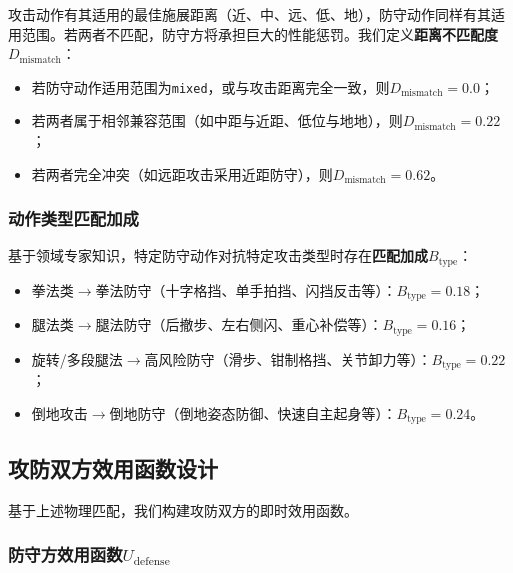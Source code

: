 \documentclass[a4paper,12pt]{article}
\numberwithin{equation}{section}
\numberwithin{table}{section}
\numberwithin{figure}{section}
\begin{document}
攻击动作有其适用的最佳施展距离（近、中、远、低、地），防守动作同样有其适用范围。若两者不匹配，防守方将承担巨大的性能惩罚。我们定义\textbf{距离不匹配度}$D_{\text{mismatch}}$：
\begin{itemize}
    \item 若防守动作适用范围为\texttt{mixed}，或与攻击距离完全一致，则$D_{\text{mismatch}} = 0.0$；
    \item 若两者属于相邻兼容范围（如中距与近距、低位与地地），则$D_{\text{mismatch}} = 0.22$；
    \item 若两者完全冲突（如远距攻击采用近距防守），则$D_{\text{mismatch}} = 0.62$。
\end{itemize}

\subsubsection{动作类型匹配加成}

基于领域专家知识，特定防守动作对抗特定攻击类型时存在\textbf{匹配加成}$B_{\text{type}}$：
\begin{itemize}
    \item 拳法类$\rightarrow$拳法防守（十字格挡、单手拍挡、闪挡反击等）：$B_{\text{type}} = 0.18$；
    \item 腿法类$\rightarrow$腿法防守（后撤步、左右侧闪、重心补偿等）：$B_{\text{type}} = 0.16$；
    \item 旋转/多段腿法$\rightarrow$高风险防守（滑步、钳制格挡、关节卸力等）：$B_{\text{type}} = 0.22$；
    \item 倒地攻击$\rightarrow$倒地防守（倒地姿态防御、快速自主起身等）：$B_{\text{type}} = 0.24$。
\end{itemize}

\subsection{攻防双方效用函数设计}

基于上述物理匹配，我们构建攻防双方的即时效用函数。

\subsubsection{防守方效用函数$U_{\text{defense}}$}
\end{document}
